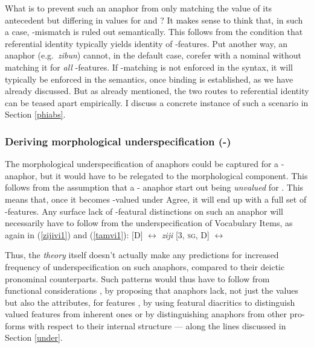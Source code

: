 \documentclass[output=paper, modfonts, nonflat]{langsci/langscibook}
\begin{document}
What is to prevent such an anaphor from only matching the \person{}
value of its antecedent but differing in values for \num{} and
\gender? It makes sense to think that, in such a case, \ph-mismatch is
ruled out semantically. This follows from the condition that
referential identity typically yields identity of \ph-features. Put
another way, an anaphor (e.g.\ \textit{zibun}) cannot, in the default
case, corefer with a nominal without matching it for \textit{all}
\ph-features. If \ph-matching is not enforced in the syntax, it will
typically be enforced in the semantics, once binding is established,
as we have already discussed. But as already mentioned, the two routes
to referential identity can be teased apart empirically. I discuss a
concrete instance of such a scenario in Section \ref{phiabs}. 



\subsubsection{Deriving morphological underspecification (\nul-\person)}

The morphological underspecification of anaphors could be captured for
a \nul-\person{} anaphor, but it would have to be relegated to the
morphological component. This follows from the assumption that a
\nul-\person{} anaphor start out being \emph{unvalued} for
\person. This means that, once it becomes \ph-valued under Agree, it
will end up with a full set of \ph-features. Any surface lack of
\ph-featural distinctions on such an anaphor will necessarily have to
follow from the underspecification of Vocabulary Items, as again in
(\ref{zijivi1}) and (\ref{tamvi1}): \ea\label{zijivi1} \textsc{[D]}
$\leftrightarrow$ \textit{ziji} \ex\label{tamvi1} \textsc{[3, sg, D]}
$\leftrightarrow$ \taan{} \z

\noindent Thus, the \emph{theory} itself doesn't actually make any predictions
for increased frequency of underspecification on such anaphors,
compared to their deictic pronominal counterparts. Such patterns would
thus have to follow from functional considerations
\citep{roorwyn:2011}, by proposing that anaphors lack, not just the
values but also the attributes, for \ph{} features
\citep{kratzer:2009}, by using featural diacritics to distinguish
valued features from inherent ones \citep{roorwyn:2011} or by
distinguishing anaphors from other pro-forms with respect to their
internal structure \citep{heinat:2008, dechainewiltschko:2012} ---
along the lines discussed in Section \ref{under}.
\end{document}
